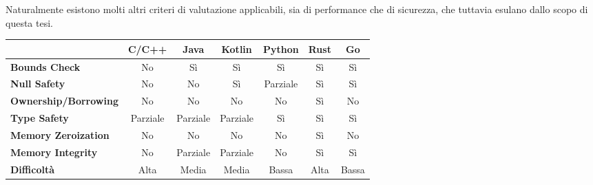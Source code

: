 Naturalmente esistono molti altri criteri di valutazione applicabili, sia di
performance che di sicurezza, che tuttavia esulano dallo scopo di questa tesi.

\setlength{\tabcolsep}{4pt}
\begin{table}[H]
  \small
  \centering
  \begin{threeparttable}
    \begin{tabular}{l|c|c|c|c|c|c|}
      \multicolumn{1}{l}{}           & \textbf{C/C++}                & \textbf{Java}                 & \textbf{Kotlin}               & \textbf{Python}               & \textbf{Rust}                    & \textbf{Go}                      \\
      \hline
      \textbf{Bounds Check}          & \cellcolor{red!20}No          & \cellcolor{green!20}Sì        & \cellcolor{green!20}Sì        & \cellcolor{green!20}Sì        & \cellcolor{green!20}Sì           & \cellcolor{green!20}Sì           \\
      \textbf{Null Safety}           & \cellcolor{red!20}No          & \cellcolor{red!20}No          & \cellcolor{green!20}Sì        & \cellcolor{yellow!20}Parziale & \cellcolor{green!20}Sì           & \cellcolor{green!20}Sì           \\
      \textbf{Ownership/Borrowing}   & \cellcolor{red!20}No          & \cellcolor{red!20}No          & \cellcolor{red!20}No          & \cellcolor{red!20}No          & \cellcolor{green!20}Sì           & \cellcolor{red!20}No             \\
      \textbf{Type Safety}           & \cellcolor{yellow!20}Parziale & \cellcolor{yellow!20}Parziale & \cellcolor{yellow!20}Parziale & \cellcolor{green!20}Sì        & \cellcolor{green!20}Sì           & \cellcolor{green!20}Sì           \\
      \textbf{Memory Zeroization}    & \cellcolor{red!20}No          & \cellcolor{red!20}No          & \cellcolor{red!20}No          & \cellcolor{red!20}No          & \cellcolor{green!20}Sì\tnote{a}  & \cellcolor{red!20}No             \\
      \textbf{Memory Integrity}      & \cellcolor{red!20}No          & \cellcolor{yellow!20}Parziale & \cellcolor{yellow!20}Parziale & \cellcolor{red!20}No          & \cellcolor{green!20}Sì           & \cellcolor{green!20}Sì           \\
      \hline
      \textbf{Difficoltà}\tnote{b}   & \cellcolor{red!20}Alta        & \cellcolor{yellow!20}Media    & \cellcolor{yellow!20}Media    & \cellcolor{green!20}Bassa     & \cellcolor{red!20}Alta           & \cellcolor{green!20}Bassa        \\

\end{tabular}
\end{threeparttable}
\end{table}
